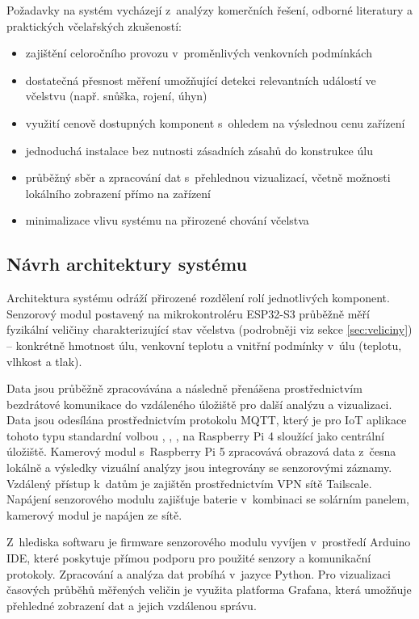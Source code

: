 Požadavky na systém vycházejí z~analýzy komerčních řešení, odborné literatury a praktických včelařských zkušeností:

\begin{itemize}
    \item zajištění celoročního provozu v~proměnlivých venkovních podmínkách
    \item dostatečná přesnost měření umožňující detekci relevantních událostí ve včelstvu (např. snůška, rojení, úhyn)
    \item využití cenově dostupných komponent s~ohledem na výslednou cenu zařízení
    \item jednoduchá instalace bez nutnosti zásadních zásahů do konstrukce úlu
    \item průběžný sběr a zpracování dat s~přehlednou vizualizací, včetně možnosti lokálního zobrazení přímo na zařízení
    \item minimalizace vlivu systému na přirozené chování včelstva
\end{itemize}

\subsection*{Návrh architektury systému}
Architektura systému odráží přirozené rozdělení rolí jednotlivých komponent. Senzorový modul postavený na mikrokontroléru ESP32-S3 průběžně měří fyzikální veličiny charakterizující stav včelstva (podrobněji viz sekce \ref{sec:veliciny}) -- konkrétně hmotnost úlu, venkovní teplotu a vnitřní podmínky v~úlu (teplotu, vlhkost a tlak).

Data jsou průběžně zpracovávána a následně přenášena prostřednictvím bezdrátové komunikace do vzdáleného úložiště pro další analýzu a vizualizaci. Data jsou odesílána prostřednictvím protokolu MQTT, který je pro IoT aplikace tohoto typu standardní volbou \cite{Beemon2021}, \cite{Nevlacil2023}, \cite{Chovancova2025}, na Raspberry Pi 4 sloužící jako centrální úložiště. Kamerový modul s~Raspberry Pi 5 zpracovává obrazová data z~česna lokálně a výsledky vizuální analýzy jsou integrovány se senzorovými záznamy. Vzdálený přístup k~datům je zajištěn prostřednictvím VPN sítě Tailscale. Napájení senzorového modulu zajišťuje baterie v~kombinaci se solárním panelem, kamerový modul je napájen ze sítě.

Z~hlediska softwaru je firmware senzorového modulu vyvíjen v~prostředí Arduino IDE, které poskytuje přímou podporu pro použité senzory a komunikační protokoly. Zpracování a analýza dat probíhá v~jazyce Python. Pro vizualizaci časových průběhů měřených veličin je využita platforma Grafana, která umožňuje přehledné zobrazení dat a jejich vzdálenou správu.

